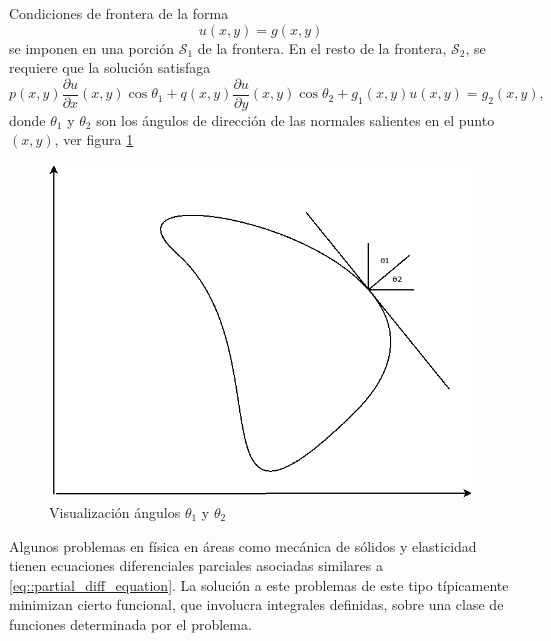 \documentclass[a4paper]{article}
\begin{document}
Condiciones de frontera de la forma
\begin{equation}\label{eq::boundary1}
u(x,y)=g(x,y)
\end{equation}
se imponen en una porción $\mathcal{S}_1$ de la frontera. En el resto de la frontera, $\mathcal{S}_2$, se requiere que la solución satisfaga
\begin{equation}\label{eq:boundary2}
p(x,y)\frac{\partial u}{\partial x}(x,y)\cos\theta_1+q(x,y)\frac{\partial u}{\partial y}(x,y)\cos\theta_2+g_1(x,y)u(x,y)=g_2(x,y),
\end{equation}
donde $\theta_1$ y $\theta_2$ son los ángulos de dirección de las normales salientes en el punto $(x,y)$, ver figura \ref{fig::fig1}
\begin{figure}[h]
\begin{center}
\includegraphics[scale=0.42]{./fig1.png} 
\end{center} 
\caption{Visualización ángulos $\theta_1$ y $\theta_2$}
\label{fig::fig1}
\end{figure}
Algunos problemas en física en áreas como mecánica de sólidos y elasticidad tienen ecuaciones diferenciales parciales asociadas similares a \ref{eq::partial_diff_equation}. La solución a este problemas de este tipo típicamente minimizan cierto funcional, que involucra integrales definidas, sobre una clase de funciones determinada por el problema.\\
\end{document}
